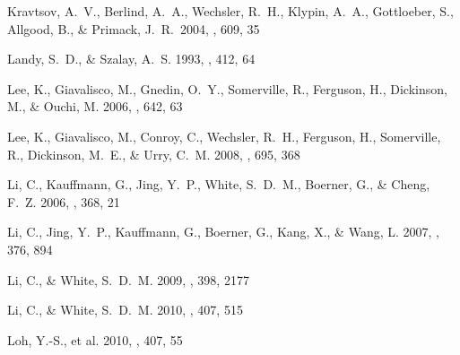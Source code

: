 \documentclass[]{emulateapj}
\begin{document}
\begin{thebibliography}{999}
Kravtsov, A.\ V., Berlind, A.\ A., Wechsler, R.\ H., Klypin, A.\ A.,
Gottloeber, S., Allgood, B., \& Primack, J.\ R.\ 2004, \apj, 609, 35


Landy, S.\ D., \& Szalay, A.\ S. 1993, \apj, 412, 64

Lee, K., Giavalisco, M., Gnedin, O.\ Y., Somerville, R., Ferguson, H., 
Dickinson, M., \& Ouchi, M. 2006, 
\apj, 642, 63 %

Lee, K., Giavalisco, M., Conroy, C., Wechsler, R.\ H., Ferguson, H., 
Somerville, R., Dickinson, M.\ E., \& Urry, C.\ M. 2008,
\apj, 695, 368 %


Li, C., Kauffmann, G., Jing, Y.\ P., White, S.\ D.\ M., Boerner, G., \& 
Cheng, F.\ Z. 2006, \mnras, 368, 21

Li, C., Jing, Y.\ P., Kauffmann, G., Boerner, G., Kang, X., \& Wang, L.
2007, \mnras, 376, 894

Li, C., \& White, S.\ D.\ M. 2009, \mnras, 398, 2177

Li, C., \& White, S.\ D.\ M. 2010, \mnras, 407, 515 %

Loh, Y.-S., et al. 2010, \mnras, 407, 55 %


\end{thebibliography}
\end{document}
